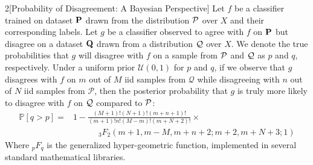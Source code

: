 \begin{manualtheorem}{2}[Probability of Disagreement: A Bayesian Perspective]
    \label{th:bayes-shift}
    Let $f$ be a classifier trained on dataset $\mathbf{P}$ drawn from the distribution $\mathcal{P}$ over $X$ and their corresponding labels.
    Let $g$ be a classifier observed to agree with $f$ on $\mathbf{P}$ but disagree on a dataset $\mathbf{Q}$ drawn from a distribution $\mathcal{Q}$ over $X$.
    We denote the true probabilities that $g$ will disagree with $f$ on a sample from $\mathcal{P}$ and $\mathcal{Q}$ as $p$ and $q$, respectively.
    Under a uniform prior $\mathcal{U}(0,1)$ for $p$ and $q$,
    if we observe that $g$ disagrees with $f$ on $m$ out of $M$ iid samples from $\mathcal{Q}$ while disagreeing with $n$ out of $N$ iid samples from $\mathcal{P}$, then
    the posterior probability that $g$ is truly more likely to disagree with $f$ on $\mathcal{Q}$ compared to $\mathcal{P}$:
    \begin{align}
        \mathbb{P}[q > p] = &1 -\frac{(M+1)! (N+1)! (m+n+1)!}{(m+1)! n! (M-m)! (m+N+2)!} \times \label{eq:hyper}\\
        &\quad\quad\quad  _3F_2(m+1,m-M,m+n+2;m+2,m+N+3;1) \nonumber
    \end{align}
    Where $_p{F}_q$ is the generalized hyper-geometric function, implemented in several standard mathematical libraries.
\end{manualtheorem}
